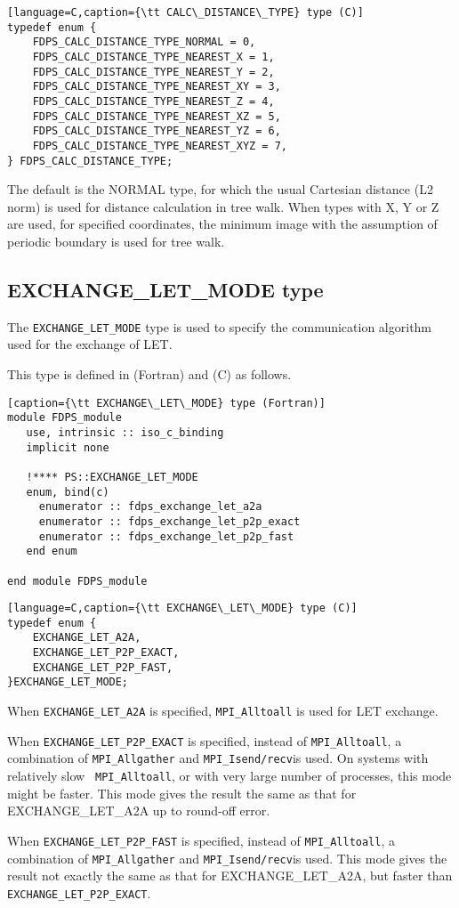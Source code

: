 \begin{lstlisting}[language=C,caption={\tt CALC\_DISTANCE\_TYPE} type (C)]
typedef enum {
    FDPS_CALC_DISTANCE_TYPE_NORMAL = 0,
    FDPS_CALC_DISTANCE_TYPE_NEAREST_X = 1,
    FDPS_CALC_DISTANCE_TYPE_NEAREST_Y = 2,
    FDPS_CALC_DISTANCE_TYPE_NEAREST_XY = 3,
    FDPS_CALC_DISTANCE_TYPE_NEAREST_Z = 4,
    FDPS_CALC_DISTANCE_TYPE_NEAREST_XZ = 5,
    FDPS_CALC_DISTANCE_TYPE_NEAREST_YZ = 6,
    FDPS_CALC_DISTANCE_TYPE_NEAREST_XYZ = 7,
} FDPS_CALC_DISTANCE_TYPE;
\end{lstlisting}

The default is the NORMAL type, for which the usual Cartesian distance
(L2 norm) is used for distance calculation in tree walk.
When types with X, Y or Z are used, for specified coordinates,
the minimum image with the assumption of periodic boundary is used for
tree walk.

\subsection{EXCHANGE\_LET\_MODE type}
\label{subsec:enum_exchange_let_mode}
The {\tt EXCHANGE\_LET\_MODE} type is used to specify the
communication algorithm used for the exchange of LET.

This type is defined in  (Fortran)
and  (C) as follows.

\begin{lstlisting}[caption={\tt EXCHANGE\_LET\_MODE} type (Fortran)]
module FDPS_module
   use, intrinsic :: iso_c_binding
   implicit none
   
   !**** PS::EXCHANGE_LET_MODE
   enum, bind(c)
     enumerator :: fdps_exchange_let_a2a
     enumerator :: fdps_exchange_let_p2p_exact
     enumerator :: fdps_exchange_let_p2p_fast
   end enum
   
end module FDPS_module
\end{lstlisting}

\begin{lstlisting}[language=C,caption={\tt EXCHANGE\_LET\_MODE} type (C)]
typedef enum {
    EXCHANGE_LET_A2A,
    EXCHANGE_LET_P2P_EXACT,
    EXCHANGE_LET_P2P_FAST,
}EXCHANGE_LET_MODE;
\end{lstlisting}

When {\tt EXCHANGE\_LET\_A2A} is specified, 
{\tt MPI\_Alltoall} is used for LET exchange.


When {\tt EXCHANGE\_LET\_P2P\_EXACT} is specified,
instead of {\tt MPI\_Alltoall}, a combination of {\tt MPI\_Allgather}
and {\tt MPI\_Isend/recv}is used. On systems with relatively slow {\tt
MPI\_Alltoall}, or with very large number of processes, this mode
might be faster. This mode gives the result the same as that for
EXCHANGE\_LET\_A2A up to round-off error.


When {\tt EXCHANGE\_LET\_P2P\_FAST} is specified,
instead of {\tt MPI\_Alltoall}, a combination of {\tt MPI\_Allgather}
and {\tt MPI\_Isend/recv}is used. This mode gives the result not
exactly the same as that for
EXCHANGE\_LET\_A2A, but faster than
{\tt EXCHANGE\_LET\_P2P\_EXACT}.
